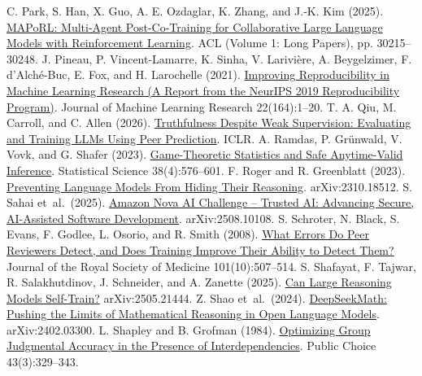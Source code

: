 \begin{thebibliography}{}
 C. Park, S. Han, X. Guo, A. E. Ozdaglar, K. Zhang, and J.-K. Kim (2025). \href{https://doi.org/10.18653/v1/2025.acl-long.1459}{MAPoRL: Multi-Agent Post-Co-Training for Collaborative Large Language Models with Reinforcement Learning}. ACL (Volume 1: Long Papers), pp. 30215--30248.
 J. Pineau, P. Vincent-Lamarre, K. Sinha, V. Larivi\`ere, A. Beygelzimer, F. d'Alch\'e-Buc, E. Fox, and H. Larochelle (2021). \href{https://www.jmlr.org/papers/v22/20-303.html}{Improving Reproducibility in Machine Learning Research (A Report from the NeurIPS 2019 Reproducibility Program)}. Journal of Machine Learning Research 22(164):1--20.
 T. A. Qiu, M. Carroll, and C. Allen (2026). \href{https://arxiv.org/abs/2601.20299}{Truthfulness Despite Weak Supervision: Evaluating and Training LLMs Using Peer Prediction}. ICLR.
 A. Ramdas, P. Gr{\"u}nwald, V. Vovk, and G. Shafer (2023). \href{https://doi.org/10.1214/23-STS894}{Game-Theoretic Statistics and Safe Anytime-Valid Inference}. Statistical Science 38(4):576--601.
 F. Roger and R. Greenblatt (2023). \href{https://arxiv.org/abs/2310.18512}{Preventing Language Models From Hiding Their Reasoning}. arXiv:2310.18512.
 S. Sahai et~al.\ (2025). \href{https://arxiv.org/abs/2508.10108}{Amazon Nova AI Challenge -- Trusted AI: Advancing Secure, AI-Assisted Software Development}. arXiv:2508.10108.
 S. Schroter, N. Black, S. Evans, F. Godlee, L. Osorio, and R. Smith (2008). \href{https://doi.org/10.1258/jrsm.2008.080062}{What Errors Do Peer Reviewers Detect, and Does Training Improve Their Ability to Detect Them?} Journal of the Royal Society of Medicine 101(10):507--514.
 S. Shafayat, F. Tajwar, R. Salakhutdinov, J. Schneider, and A. Zanette (2025). \href{https://arxiv.org/abs/2505.21444}{Can Large Reasoning Models Self-Train?} arXiv:2505.21444.
 Z. Shao et~al.\ (2024). \href{https://arxiv.org/abs/2402.03300}{DeepSeekMath: Pushing the Limits of Mathematical Reasoning in Open Language Models}. arXiv:2402.03300.
 L. Shapley and B. Grofman (1984). \href{https://doi.org/10.1007/BF00118940}{Optimizing Group Judgmental Accuracy in the Presence of Interdependencies}. Public Choice 43(3):329--343.

\end{thebibliography}
